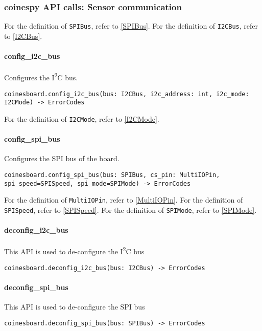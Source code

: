 \subsubsection{coinespy API calls: Sensor communication}

For the definition of \texttt{SPIBus}, refer to \ref{SPIBus}. For the definition of \texttt{I2CBus}, refer to \ref{I2CBus}.

\paragraph{config\_i2c\_bus}
Configures the I\textsuperscript{2}C bus.

\begin{lstlisting}
coinesboard.config_i2c_bus(bus: I2CBus, i2c_address: int, i2c_mode: I2CMode) -> ErrorCodes
\end{lstlisting}

For the definition of \texttt{I2CMode}, refer to \ref{I2CMode}.

\paragraph{config\_spi\_bus}
Configures the SPI bus of the board.
\begin{lstlisting}
coinesboard.config_spi_bus(bus: SPIBus, cs_pin: MultiIOPin, spi_speed=SPISpeed, spi_mode=SPIMode) -> ErrorCodes
\end{lstlisting}

For the definition of \texttt{MultiIOPin}, refer to \ref{MultiIOPin}. For the definition of \texttt{SPISpeed}, refer to \ref{SPISpeed}. For the definition of \texttt{SPIMode}, refer to \ref{SPIMode}.

\paragraph{deconfig\_i2c\_bus}
This API is used to de-configure the I\textsuperscript{2}C bus

\begin{lstlisting}
coinesboard.deconfig_i2c_bus(bus: I2CBus) -> ErrorCodes
\end{lstlisting}

\paragraph{deconfig\_spi\_bus}
This API is used to de-configure the SPI bus

\begin{lstlisting}
coinesboard.deconfig_spi_bus(bus: SPIBus) -> ErrorCodes
\end{lstlisting}

